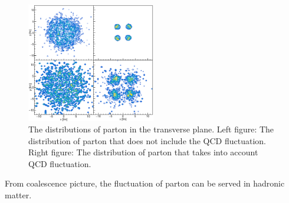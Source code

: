 \documentclass[11pt,a4paper,openany]{article}
\begin{document}
\begin{figure}[!ht]
  \centering
  \includegraphics[width=0.5\textwidth]{./figure/square.eps}
  \caption{The distributions of parton in the transverse plane. Left figure: The distribution of
           parton that does not include the QCD fluctuation. Right figure: The distribution of
           parton that takes into account QCD fluctuation.}
  \label{fig:phaseSpace}
\end{figure}
From coalescence picture, the fluctuation of parton can be served in hadronic matter.
\end{document}
